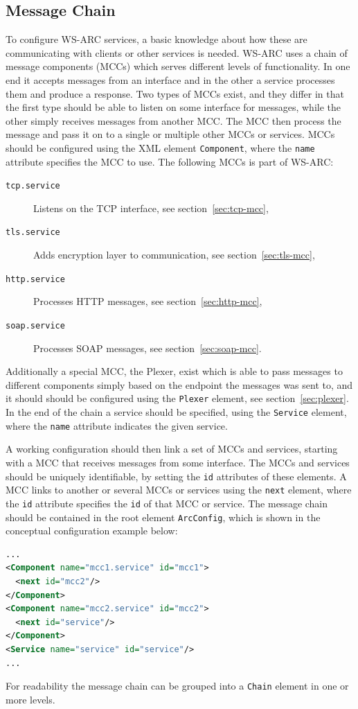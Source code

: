 \documentclass{article}
\begin{document}
\subsection{Message Chain}\label{sec:Message Chain}
To configure WS-ARC services, a basic knowledge about how these are
communicating with clients or other services is needed. WS-ARC uses a chain of
message components (MCCs) which serves different levels of functionality. In one
end it accepts messages from an interface and in the other a service processes
them and produce a response. Two types of MCCs exist, and they differ in that
the first type should be able to listen on some interface for messages, while
the other simply
receives messages from another MCC. The MCC then process the message and pass it
on to a single or multiple other MCCs or services. MCCs should be configured
using the XML element \texttt{Component}, where the \texttt{name} attribute
specifies the MCC to use. The following MCCs is part of WS-ARC:
\begin{description}
\item[\texttt{tcp.service}] Listens on the TCP interface, see
  section~\ref{sec:tcp-mcc},
\item[\texttt{tls.service}] Adds encryption layer to communication, see
  section~\ref{sec:tls-mcc},
\item[\texttt{http.service}] Processes HTTP messages, see
  section~\ref{sec:http-mcc},
\item[\texttt{soap.service}] Processes SOAP messages, see
  section~\ref{sec:soap-mcc}.
\end{description}
Additionally a special MCC,
the Plexer, exist which is able to pass messages to different components simply
based on the endpoint the messages was sent to, and it should should be
configured using the \texttt{Plexer} element, see section~\ref{sec:plexer}. In
the end of the chain a service should be specified, using the  \texttt{Service}
element, where the \texttt{name} attribute indicates the given service.

A working configuration should then link a set of MCCs and services, starting
with a MCC that receives messages from some interface. The MCCs and services
should be uniquely identifiable, by setting the \texttt{id} attributes of these
elements. A MCC links to another or several MCCs or services using the
\texttt{next} element, where the \texttt{id} attribute specifies the \texttt{id}
of that MCC or service. The message chain should be contained in the root
element \texttt{ArcConfig}, which is shown in the conceptual configuration
example below:
\begin{lstlisting}[language=xml]
...
<Component name="mcc1.service" id="mcc1">
  <next id="mcc2"/>
</Component>
<Component name="mcc2.service" id="mcc2">
  <next id="service"/>
</Component>
<Service name="service" id="service"/>
...
\end{lstlisting}
For readability the message chain can be grouped into a \texttt{Chain} element
in one or more levels.
\end{document}
